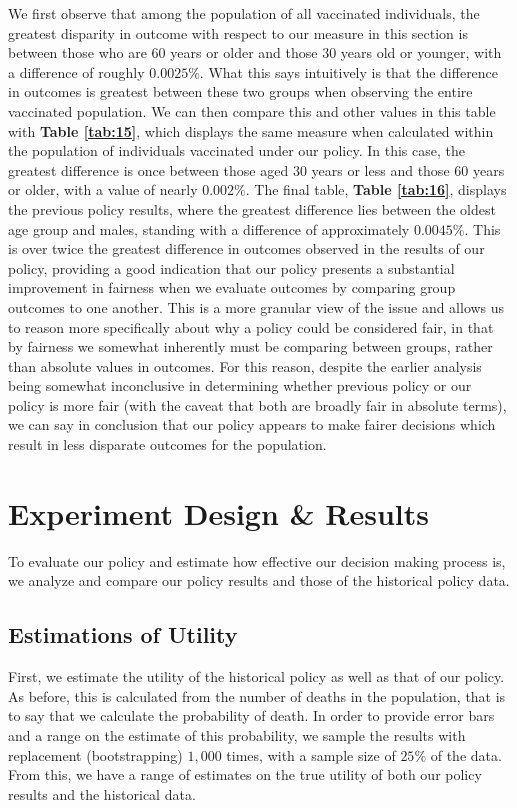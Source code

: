 \documentclass{article}
\begin{document}
We first observe that among the population of all vaccinated individuals, the greatest disparity in outcome with respect to our measure in this section is between those who are $60$ years or older and those $30$ years old or younger, with a difference of roughly $0.0025\%$. What this says intuitively is that the difference in outcomes is greatest between these two groups when observing the entire vaccinated population. We can then compare this and other values in this table with \textbf{Table \ref{tab:15}}, which displays the same measure when calculated within the population of individuals vaccinated under our policy. In this case, the greatest difference is once between those aged $30$ years or less and those $60$ years or older, with a value of nearly $0.002\%$. The final table, \textbf{Table \ref{tab:16}}, displays the previous policy results, where the greatest difference lies between the oldest age group and males, standing with a difference of approximately $0.0045\%$. This is over twice the greatest difference in outcomes observed in the results of our policy, providing a good indication that our policy presents a substantial improvement in fairness when we evaluate outcomes by comparing group outcomes to one another. This is a more granular view of the issue and allows us to reason more specifically about why a policy could be considered fair, in that by fairness we somewhat inherently must be comparing between groups, rather than absolute values in outcomes. For this reason, despite the earlier analysis being somewhat inconclusive in determining whether previous policy or our policy is more fair (with the caveat that both are broadly fair in absolute terms), we can say in conclusion that our policy appears to make fairer decisions which result in less disparate outcomes for the population.

\section{Experiment Design \& Results}
\label{sec: Experiment Design}

To evaluate our policy and estimate how effective our decision making process is, we analyze and compare our policy results and those of the historical policy data.

\subsection{Estimations of Utility}

First, we estimate the utility of the historical policy as well as that of our policy. As before, this is calculated from the number of deaths in the population, that is to say that we calculate the probability of death. In order to provide error bars and a range on the estimate of this probability, we sample the results with replacement (bootstrapping) $1,000$ times, with a sample size of $25\%$ of the data. From this, we have a range of estimates on the true utility of both our policy results and the historical data.
\end{document}

